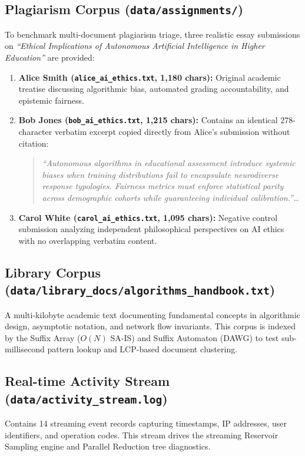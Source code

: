 \subsection{Plagiarism Corpus (\texttt{data/assignments/})}
To benchmark multi-document plagiarism triage, three realistic essay submissions on \textit{``Ethical Implications of Autonomous Artificial Intelligence in Higher Education''} are provided:
\begin{enumerate}
    \item \textbf{Alice Smith (\texttt{alice\_ai_ethics.txt}, 1,180 chars):} Original academic treatise discussing algorithmic bias, automated grading accountability, and epistemic fairness.
    \item \textbf{Bob Jones (\texttt{bob\_ai_ethics.txt}, 1,215 chars):} Contains an identical 278-character verbatim excerpt copied directly from Alice's submission without citation:
    \begin{quote}
    \small\slshape
    ``Autonomous algorithms in educational assessment introduce systemic biases when training distributions fail to encapsulate neurodiverse response typologies. Fairness metrics must enforce statistical parity across demographic cohorts while guaranteeing individual calibration.''\dots
    \end{quote}
    \item \textbf{Carol White (\texttt{carol\_ai_ethics.txt}, 1,095 chars):} Negative control submission analyzing independent philosophical perspectives on AI ethics with no overlapping verbatim content.
\end{enumerate}

\subsection{Library Corpus (\texttt{data/library_docs/algorithms_handbook.txt})}
A multi-kilobyte academic text documenting fundamental concepts in algorithmic design, asymptotic notation, and network flow invariants. This corpus is indexed by the Suffix Array ($O(N)$ SA-IS) and Suffix Automaton (DAWG) to test sub-millisecond pattern lookup and LCP-based document clustering.

\subsection{Real-time Activity Stream (\texttt{data/activity_stream.log})}
Contains 14 streaming event records capturing timestamps, IP addresses, user identifiers, and operation codes. This stream drives the streaming Reservoir Sampling engine and Parallel Reduction tree diagnostics.

